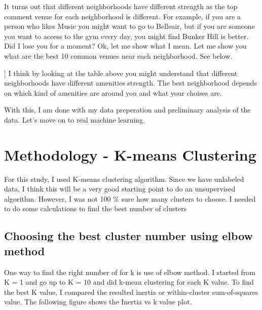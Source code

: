 \documentclass[11pt]{article}
\begin{document}
    It turns out that different neighborhoods have different strength as the
top comment venue for each neighborhood is different. For example, if
you are a person who likes Music you might want to go to Belleair, but
if you are someone you want to access to the gym every day, you might
find Bunker Hill is better. Did I lose you for a moment? Ok, let me show
what I mean. Let me show you what are the best 10 common venues near
each neighborhood. See below.

 \begin{center}
    \end{center}

   ]         
    I think by looking at the table above you might understand that
different neighborhoods have different amenities strength. The best
neighborhood depends on which kind of amenities are around you and what
your choises are.

With this, I am done with my data preperation and preliminary analysis
of the data. Let's move on to real machine learning.

\newpage
    \hypertarget{methodology---k-means-clustering}{%
\section{ Methodology - K-means
Clustering}\label{methodology---k-means-clustering}}

    For this study, I used K-means clustering algorithm. Since we
have unlabeled data, I think this will be a very good starting point to
do an unsupervised algorithm. However, I was not 100 \% sure how many
clusters to choose. I needed to do some calculations to find the best number
of clusters

    \hypertarget{choosing-the-best-cluster-number-using-elbow-method}{%
\subsection{Choosing the best cluster number using elbow
method}\label{choosing-the-best-cluster-number-using-elbow-method}}

One way to find the right number of for k is use of elbow method. I started from K = 1 and go up to K = 10 and did k-mean clustering for each K value. To find the best K value, I compared the resulted inertia or within-cluster sum-of-squares value. The following figure shows the Inertia vs k value plot.
\end{document}
